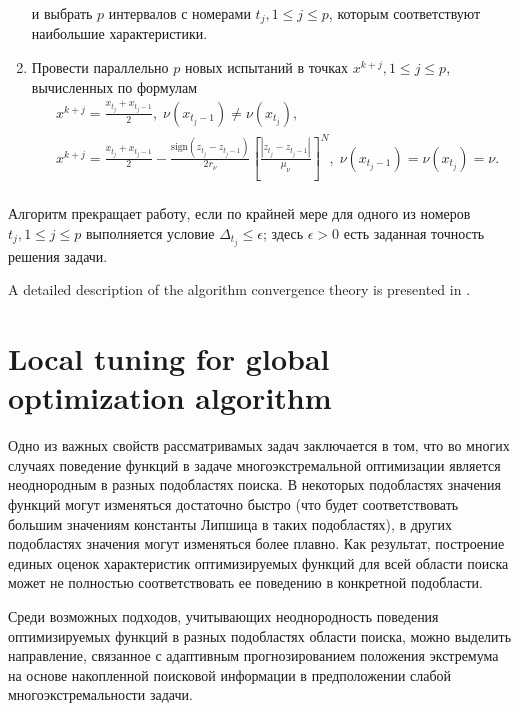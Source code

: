 \documentclass[
11pt,%
tightenlines,%
twoside,%
onecolumn,%
nofloats,%
nobibnotes,%
nofootinbib,%
superscriptaddress,%
noshowpacs,%
centertags]%
{revtex4}
\begin{document}
\begin{enumerate}
\begin{equation}
\end{equation}
и выбрать $p$ интервалов с номерами $t_j, 1\leq j \leq p$, которым соответствуют наибольшие характеристики.
\item
Провести параллельно $p$ новых испытаний в точках $x^{k+j}, 1 \leq j \leq p$, вычисленных по формулам
\begin{eqnarray*}
& x^{k+j}=\frac{x_{t_j}+x_{t_j-1}}{2}, \; \nu(x_{t_j-1})\neq \nu(x_{t_j}), \\
& x^{k+j}=\frac{x_{t_j}+x_{t_j-1}}{2}- \frac{\mathrm{sign}(z_{t_j}-z_{t_j-1})}{2r_\nu}\left[\frac{\left|z_{t_j}-z_{t_j-1}\right|}{\mu_\nu}\right]^N, \; \nu(x_{t_j-1})=\nu(x_{t_j})=\nu. \\
\end{eqnarray*} 

\end{enumerate}

Алгоритм прекращает работу, если по крайней мере для одного из номеров $t_j, 1\leq j \leq p$ выполняется условие $\Delta_{t_j}\leq \epsilon$; здесь $\epsilon>0$ есть заданная точность решения задачи.

A detailed description of the algorithm convergence theory is presented in \cite{Strongin2000,Strongin2013}.




\section{Local tuning for global optimization algorithm}

Одно из важных свойств рассматривамых задач заключается в том, что во многих случаях поведение функций в задаче многоэкстремальной оптимизации является неоднородным в разных подобластях поиска. В некоторых подобластях значения функций могут изменяться достаточно быстро (что будет соответствовать большим значениям константы Липшица в таких подобластях), в других подобластях значения могут изменяться более плавно. Как результат, построение единых оценок характеристик оптимизируемых функций для всей области поиска может не полностью соответствовать ее поведению в конкретной подобласти. 

Среди возможных подходов, учитывающих неоднородность поведения оптимизируемых функций в разных подобластях области поиска, можно выделить направление, связанное с адаптивным прогнозированием положения экстремума на основе накопленной поисковой информации в предположении слабой многоэкстремальности задачи.
\end{document}
